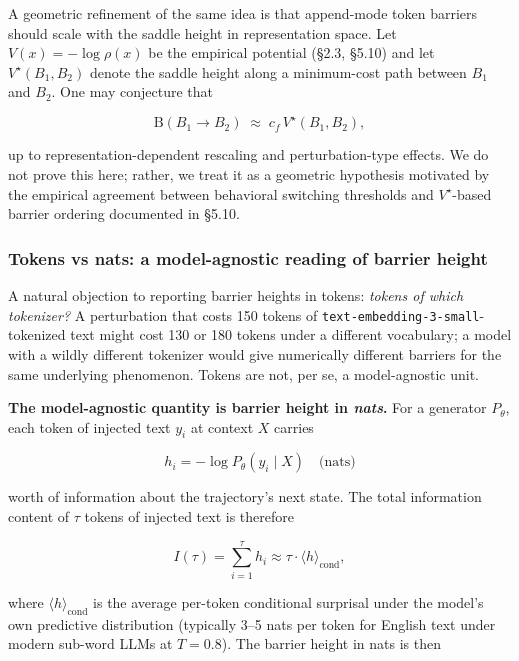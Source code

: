 \documentclass{article}
\theoremstyle{plain}
\theoremstyle{definition}
\begin{document}
A geometric refinement of the same idea is that append-mode token
barriers should scale with the saddle height in representation space.
Let $V(x) = -\log \rho(x)$ be the empirical potential (§2.3,
§5.10) and let $V^\star(B_1, B_2)$ denote the saddle height along a
minimum-cost path between $B_1$ and $B_2$. One may conjecture that

\begin{equation*}
\mathrm{B}(B_1 \to B_2) \;\approx\; c_f \, V^\star(B_1, B_2),
\end{equation*}

up to representation-dependent rescaling and perturbation-type
effects. We do not prove this here; rather, we treat it as a
geometric hypothesis motivated by the empirical agreement between
behavioral switching thresholds and $V^\star$-based barrier ordering
documented in §5.10.

\subsubsection{Tokens vs nats: a model-agnostic reading of barrier height}

A natural objection to reporting barrier heights in tokens: \textit{tokens
of which tokenizer?} A perturbation that costs 150 tokens of
\texttt{text-embedding-3-small}-tokenized text might cost 130 or 180 tokens
under a different vocabulary; a model with a wildly different
tokenizer would give numerically different barriers for the same
underlying phenomenon. Tokens are not, per se, a model-agnostic unit.

\textbf{The model-agnostic quantity is barrier height in \textit{nats}.} For a
generator $P_\theta$, each token of injected text $y_i$ at context
$X$ carries

\begin{equation*}
h_i = -\log P_\theta(y_i \mid X) \quad \text{(nats)}
\end{equation*}

worth of information about the trajectory's next state. The total
information content of $\tau$ tokens of injected text is therefore

\begin{equation*}
I(\tau) = \sum_{i=1}^{\tau} h_i \approx \tau \cdot \langle h \rangle_\text{cond},
\end{equation*}

where $\langle h \rangle_\text{cond}$ is the average per-token
conditional surprisal under the model's own predictive distribution
(typically 3–5 nats per token for English text under modern
sub-word LLMs at $T = 0.8$). The barrier height in nats is then
\end{document}
